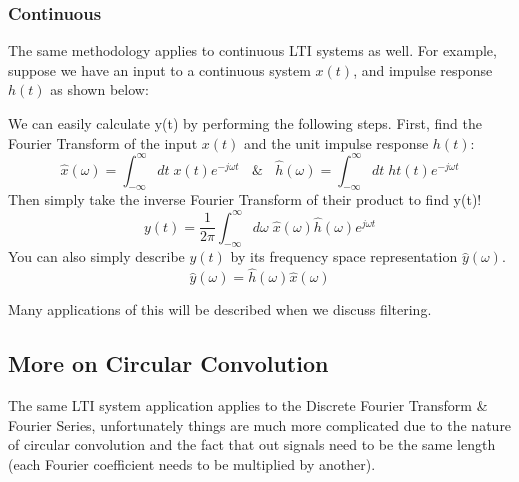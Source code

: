 \documentclass[a4paper]{article}
\numberwithin{equation}{section}
\begin{document}
\subsubsection{Continuous}
The same methodology applies to continuous LTI systems as well. For example, suppose we have an input to a continuous system $x(t)$, and impulse response $h(t)$ as shown below:
\begin{center}
\end{center}

We can easily calculate y(t) by performing the following steps. First, find the Fourier Transform  of the input $x(t)$ and the unit impulse response $h(t)$:
\begin{equation}
\hat{x}(\omega)=\int_{-\infty}^{\infty}dt\; x(t)e^{-j\omega t} \: \: \: \: \& \: \: \: \: \hat{h}(\omega)=\int_{-\infty}^{\infty}dt\; ht(t)e^{-j\omega t}
\end{equation}
Then simply take the inverse Fourier Transform of their product to find y(t)!
\begin{equation}
y(t) = \frac{1}{2\pi}\int_{-\infty}^{\infty}d\omega \; \hat{x}(\omega)\hat{h}(\omega)e^{j\omega t}
\end{equation}
You can also simply describe $y(t)$ by its frequency space representation $\hat{y}(\omega)$. 
\begin{equation}
\hat{y}(\omega)= \hat{h}(\omega)\hat{x}(\omega)
\end{equation}

Many applications of this will be described when we discuss filtering.

\subsection{More on Circular Convolution}
The same LTI system application applies to the Discrete Fourier Transform \& Fourier Series, unfortunately things are much more complicated due to the nature of circular convolution and the fact that out signals need to be the same length (each Fourier coefficient needs to be multiplied by another). \\
\end{document}
